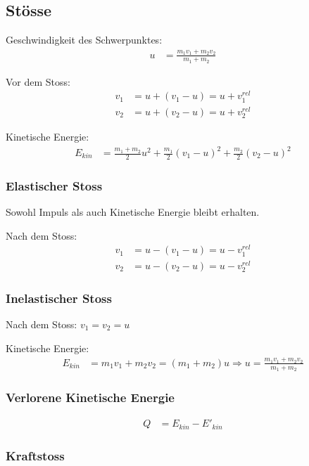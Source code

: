 \documentclass[a4paper]{scrartcl}
\begin{document}
\subsection{Stösse}
	
	Geschwindigkeit des Schwerpunktes:
	\begin{align*}
		 u &= \frac{m_1v_1 + m_2v_2}{m_1 + m_2}
	\end{align*}
	
	Vor dem Stoss:
	\begin{align*}
		v_1 &= u + (v_1 - u) = u + v_1^{rel} \\
		v_2 &= u + (v_2 - u) = u + v_2^{rel}
	\end{align*}
	
	Kinetische Energie:
	\begin{align*}
		E_{kin} &= \frac{m_1 + m_2}{2}u^2 + \frac{m_1}{2}(v_1 - u)^2 + \frac{m_2}{2}(v_2 - u)^2
	\end{align*}
	
\subsubsection{Elastischer Stoss}
	Sowohl Impuls als auch Kinetische Energie bleibt erhalten.
	
	Nach dem Stoss:
	\begin{align*}
	v_1 &= u - (v_1 - u) = u - v_1^{rel} \\
	v_2 &= u - (v_2 - u) = u - v_2^{rel}
	\end{align*}

\subsubsection{Inelastischer Stoss}
	Nach dem Stoss: $v_1 = v_2 = u$

	Kinetische Energie:
	\begin{align*}
		E_{kin} &= m_1 v_1 + m_2 v_2 = (m_1 + m_2) u \Rightarrow u = \frac{m_1 v_1 + m_2 v_2}{m_1 + m_2}
	\end{align*}

\subsubsection{Verlorene Kinetische Energie}
	\begin{align*}
		Q &= E_{kin}  - E'_{kin}
	\end{align*}

\subsubsection{Kraftstoss}
\end{document}

